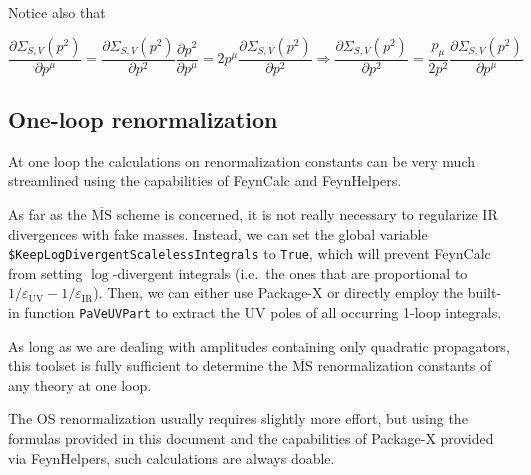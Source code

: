 \documentclass[../FeynCalcManual.tex]{subfiles}
\begin{document}
Notice also that

\begin{equation}
 \frac{\partial \Sigma_{S,V}(p^2)}{\partial p^\mu} = \frac{\partial \Sigma_{S,V}(p^2)}{\partial p^2} \frac{\partial p^2}{\partial p^\mu} = 2 p^\mu \frac{\partial \Sigma_{S,V}(p^2)}{\partial p^2} \Rightarrow 
  \frac{\partial \Sigma_{S,V}(p^2)}{\partial p^2} = \frac{p_\mu}{2 p^2 } \frac{\partial \Sigma_{S,V}(p^2)}{\partial p^\mu}
\end{equation}

\hypertarget{one-loop-renormalization}{%
\subsection{One-loop renormalization}\label{one-loop-renormalization}}

At one loop the calculations on renormalization constants can be very
much streamlined using the capabilities of FeynCalc and FeynHelpers.

As far as the \(\overline{\textrm{MS}}\) scheme is concerned, it is not
really necessary to regularize IR divergences with fake masses. Instead,
we can set the global variable
\texttt{\$KeepLogDivergentScalelessIntegrals} to \texttt{True}, which
will prevent FeynCalc from setting \(\log\)-divergent integrals
(i.e.~the ones that are proportional to
\(1/\varepsilon_{\textrm{UV}} - 1/\varepsilon_{\textrm{IR}}\)). Then, we
can either use Package-X or directly employ the built-in function
\texttt{PaVeUVPart} to extract the UV poles of all occurring 1-loop
integrals.

As long as we are dealing with amplitudes containing only quadratic
propagators, this toolset is fully sufficient to determine the
\(\overline{\textrm{MS}}\) renormalization constants of any theory at
one loop.

The OS renormalization usually requires slightly more effort, but using
the formulas provided in this document and the capabilities of Package-X
provided via FeynHelpers, such calculations are always doable.
\end{document}
